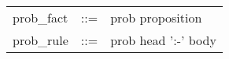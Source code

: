 \begin{tabular}{lcl}
prob\_fact &::=& prob proposition\\
prob\_rule &::=& prob head ':-' body\\
\end{tabular}
